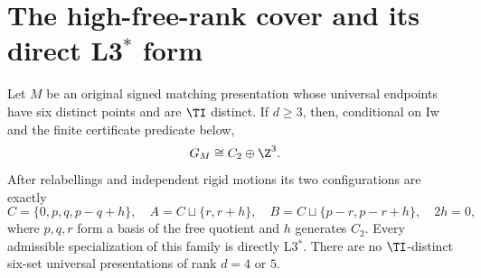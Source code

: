 \section{The high-free-rank cover and its direct \texorpdfstring{L3$^*$}{L3*} form}
\label{sec:formal-high-rank}
\begin{lemma}[HR]\label{lem:hr}
Let $M$ be an original signed matching presentation whose universal
endpoints have six distinct points and are $\TI$ distinct. If $d\ge3$,
then, conditional on Iw and the finite certificate predicate below,
\[
 G_M\cong C_2\oplus\Z^3.
\]
After relabellings and independent rigid motions its two configurations
are exactly
\begin{equation}\label{eq:hr-master}
 C=\{0,p,q,p-q+h\},\quad
 A=C\sqcup\{r,r+h\},\quad
 B=C\sqcup\{p-r,p-r+h\},\quad2h=0,
\end{equation}
where $p,q,r$ form a basis of the free quotient and $h$ generates $C_2$.
Every admissible specialization of this family is directly L3$^*$.
There are no $\TI$-distinct six-set universal presentations of rank
$d=4$ or $5$.
\end{lemma}
